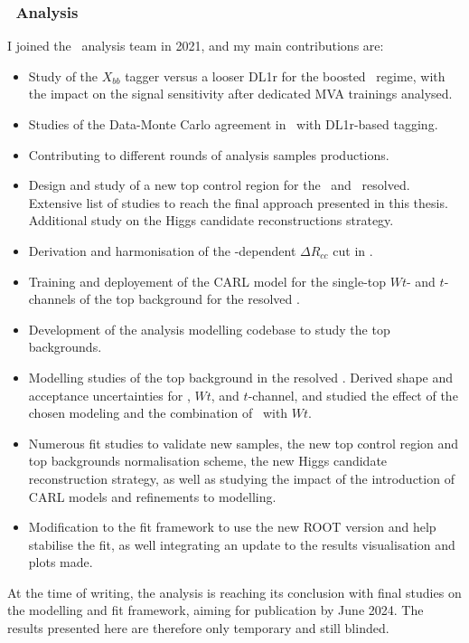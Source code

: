 \subsubsection{\boldvhbc\ Analysis}
I joined the \vhbc\ analysis team in 2021, and my main contributions are:
\begin{itemize}
    \item Study of the $X_{bb}$ tagger versus a looser DL1r for the boosted \vhb\ regime, with the impact on the signal sensitivity after dedicated MVA trainings analysed.
    \item Studies of the Data-Monte Carlo agreement in \vhc\ with DL1r-based tagging. 
    \item Contributing to different rounds of analysis samples productions.
    \item Design and study of a new top control region for the \vhc\ and \vhb\ resolved. Extensive list of studies to reach the final approach presented in this thesis. Additional study on the Higgs candidate reconstructions strategy.
    \item Derivation and harmonisation of the \ptv-dependent $\Delta R_{cc}$ cut in \vhc.
    \item Training and deployement of the CARL model for the single-top $Wt$- and $t$-channels of the top background for the resolved \vhb.
    \item Development of the analysis modelling codebase to study the top backgrounds. 
    \item Modelling studies of the top background in the resolved \vhb. Derived shape and acceptance uncertainties for \ttb, $Wt$, and $t$-channel, and studied the effect of the chosen modeling and the combination of \ttb\ with $Wt$. 
    \item Numerous fit studies to validate new samples, the new top control region and top backgrounds normalisation scheme, the new Higgs candidate reconstruction strategy, as well as studying the impact of the introduction of CARL models and refinements to modelling. 
    \item Modification to the fit framework to use the new ROOT version and help stabilise the fit, as well integrating an update to the results visualisation and plots made.
\end{itemize}
At the time of writing, the analysis is reaching its conclusion with final studies on the modelling and fit framework, aiming for publication by June 2024. The results presented here are therefore only temporary and still blinded.